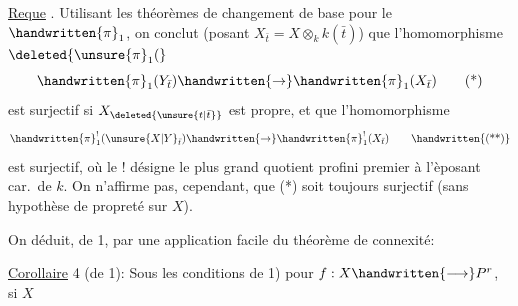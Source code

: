 \uline{Reque} . Utilisant les théorèmes de changement de base pour le $\handwritten{\pi}_1$, on conclut  (posant $X_{\bar{t}}=X\otimes_k k(\bar{t})$) que l'homomorphisme $\deleted{\unsure{\pi}_1(}$
\begingroup
\makeatletter\tagsleft@true\makeatother
\[
\handwritten{\pi}_1(Y_{\bar{t}})\handwritten{\rightarrow}\handwritten{\pi}_1(X_{\bar{t}})\tag*{(*)}
\]
\endgroup
est surjectif si $X_{\deleted{\unsure{t|\bar{t}}}}$ est propre, et que l'homomorphisme
\begingroup
\makeatletter\tagsleft@true\makeatother
\[
\handwritten{\pi}_1^{!}(\unsure{X|Y}_{\bar{t}})\handwritten{\rightarrow}\handwritten{\pi}_1^{!}(X_{\bar{t}})\tag*{\handwritten{(**)}}
\]
\endgroup
est surjectif, où le ! désigne le plus grand quotient profini premier à l'èposant car.\ de $k$. On n'affirme pas, cependant, que (*) soit toujours surjectif (sans hypothèse de propreté sur $X$).

On déduit, de 1, par une application facile du théorème de connexité:

\uline{Corollaire} 4 (de 1): Sous les conditions de 1) pour $f:X\handwritten{\longrightarrow}P^r$, si $X$
